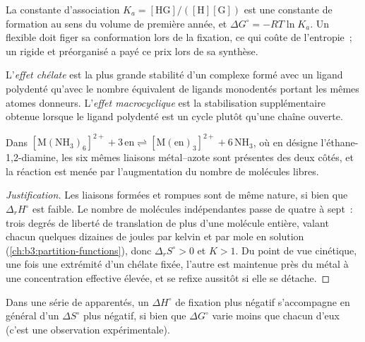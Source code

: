 La constante d'association $K_a = [\mathrm{HG}]/([\mathrm H][\mathrm G])$ est une constante de formation au sens
du volume de première année, et $\Delta G^\circ = -RT\ln K_a$. Un  flexible doit figer sa
conformation lors de la fixation, ce qui coûte de l'entropie~; un 
rigide et préorganisé a payé ce prix lors de sa synthèse.

\begin{definition}\label{def:b3:supramolecular:macrocyclic}
L'\emph{effet chélate} est la plus grande stabilité d'un
complexe formé avec un ligand polydenté qu'avec le nombre équivalent de
ligands monodentés portant les mêmes atomes donneurs. L'\emph{effet macrocyclique}
est la stabilisation supplémentaire obtenue lorsque le ligand polydenté est
un cycle plutôt qu'une chaîne ouverte.
\end{definition}

\begin{proposition}\label{prop:b3:supramolecular:chelate-entropy}
Dans $\mathrm{[M(NH_3)_6]^{2+} + 3\,en \rightleftharpoons [M(en)_3]^{2+} + 6\,NH_3}$, où en désigne l'éthane-1,2-diamine, les six mêmes
liaisons métal--azote sont présentes des deux côtés, et la réaction est
menée par l'augmentation du nombre de molécules libres.
\end{proposition}

\begin{proof}[Justification]
Les liaisons formées et rompues sont de même nature, si bien que $\Delta_rH^\circ$ est faible. Le nombre de
molécules indépendantes passe de quatre à sept~: trois degrés de liberté de
translation de plus d'une molécule entière, valant chacun quelques dizaines
de joules par kelvin et par mole en solution (\cref{ch:b3:partition-functions}), donc $\Delta_rS^\circ > 0$ et $K > 1$.
Du point de vue cinétique, une fois une extrémité d'un chélate fixée,
l'autre est maintenue près du métal à une concentration effective élevée,
et se refixe aussitôt si elle se détache.
\end{proof}

\begin{proposition}\label{prop:b3:supramolecular:compensation}
Dans une série de  apparentés, un $\Delta H^\circ$ de fixation plus négatif
s'accompagne en général d'un $\Delta S^\circ$ plus négatif, si bien que $\Delta G^\circ$ varie moins que chacun d'eux (c'est une
observation expérimentale).
\end{proposition}

